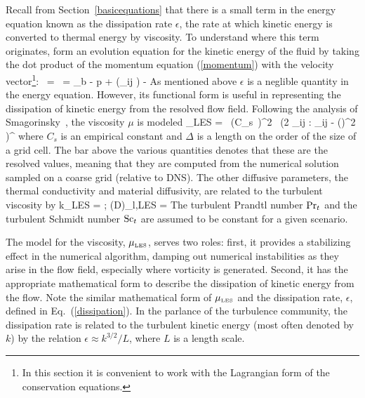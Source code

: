 \documentclass[11pt]{book}
\begin{document}
Recall from Section~\ref{basicequations} that there is a small term in the energy equation
known as the dissipation rate $\epsilon$,
the rate at which kinetic energy is converted to thermal energy by viscosity.
To understand where this term originates, form an evolution equation for the kinetic energy of the fluid by
taking the dot product of the momentum equation (\ref{momentum}) with the velocity vector\footnote{In this section
it is convenient to work with the Lagrangian form of the conservation equations. }:
\be \rho \,  \cdot \bu = \rho  \,  = \rho \bof_b \cdot \bu - \nabla p \cdot \bu + \nabla \cdot (\btau_{ij} \cdot \bu) - \epsilon \ee
As mentioned above $\epsilon$ is a neglible quantity in the energy equation. However, its functional form
is useful in representing the dissipation of kinetic energy from the resolved flow field.
Following the analysis of Smagorinsky~\cite{Smagorinsky:1}, the viscosity $\mu$ is modeled
\be \mu_{\hbox{\tiny LES}} = \rho \, (C_s\, \Delta)^2 \,
   \left(2 \; \overline{\bS}_{ij} : \overline{\bS}_{ij} -  (\nabla \cdot \overline{\bu})^2 \right)^\ha \ee
where $C_s$ is an empirical constant and $\Delta$ is a length on the
order of the size of a grid cell.
The bar above the various quantities denotes that these are the resolved values, meaning
that they are computed from the numerical solution sampled on a coarse grid (relative to DNS).
The other diffusive parameters,
the thermal conductivity and material diffusivity, are related to the turbulent viscosity by
\be k_{\hbox{\tiny LES}} = 
\quad ; \quad
 (\rho D)_{l,\hbox{\tiny LES}} = \ee
The turbulent Prandtl number $\hbox{Pr}_t$ and the turbulent Schmidt number $\hbox{Sc}_t$ are assumed to be
constant for a given scenario.

The model for the viscosity, $\mu_{\hbox{\tiny LES}}$, serves two roles: first, it provides a stabilizing
effect in the numerical
algorithm, damping out numerical instabilities as they arise in the flow field, especially where vorticity is
generated. Second, it has the appropriate mathematical form to describe the dissipation of kinetic energy from the flow.
Note the similar mathematical form of $\mu_{\hbox{\tiny LES}}$ and
the dissipation rate, $\epsilon$, defined in Eq.~(\ref{dissipation}).
In the parlance of the turbulence community, the dissipation
rate is related to the turbulent kinetic energy (most often denoted by $k$) by the
relation $\epsilon \approx k^{3/2}/L$, where $L$ is a length scale.
\end{document}
